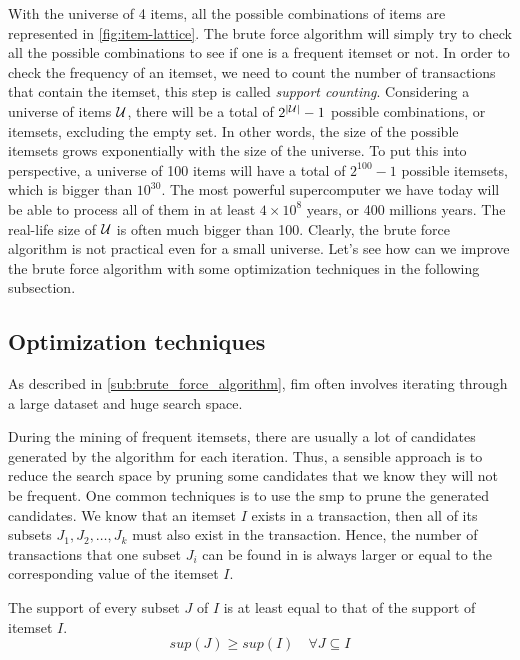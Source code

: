 With the universe of 4 items, all the possible combinations of items are represented in \autoref{fig:item-lattice}.
The brute force algorithm will simply try to check all the possible combinations to see if one is a frequent itemset or not.
In order to check the frequency of an itemset, we need to count the number of transactions that contain the itemset, this step is called \textit{support counting}.
Considering a universe of items $\mathcal{U}$, there will be a total of $2^{\left\lvert \mathcal{U} \right\rvert} - 1$ possible combinations, or itemsets, excluding the empty set.
In other words, the size of the possible itemsets grows exponentially with the size of the universe.
To put this into perspective, a universe of 100 items will have a total of $2^{100} - 1$ possible itemsets, which is bigger than $10^{30}$.
The most powerful supercomputer we have today will be able to process all of them in at least ${4\times 10^{8}}$ years, or 400 millions years.
The real-life size of $\mathcal{U}$ is often much bigger than 100.
Clearly, the brute force algorithm is not practical even for a small universe.
Let's see how can we improve the brute force algorithm with some optimization techniques in the following subsection.

\subsection{Optimization techniques}
\label{sub:optimization_techniques}
As described in \autoref{sub:brute_force_algorithm}, \acl{fim} often involves iterating through a large dataset and huge search space.

During the mining of frequent itemsets, there are usually a lot of candidates generated by the algorithm for each iteration.
Thus, a sensible approach is to reduce the search space by pruning some candidates that we know they will not be frequent.
One common techniques is to use the \acl{smp} to prune the generated candidates.
We know that an itemset $I$ exists in a transaction, then all of its subsets $J_1, J_2, \dots, J_k$ must also exist in the transaction.
Hence, the number of transactions that one subset $J_i$ can be found in is always larger or equal to the corresponding value of the itemset $I$.
\begin{definition}
    The support of every subset $J$ of $I$ is at least equal to that of the support of itemset $I$.
    \begin{equation}
        sup(J) \geq sup(I) \quad \forall J \subseteq I
    \end{equation}
\end{definition}

